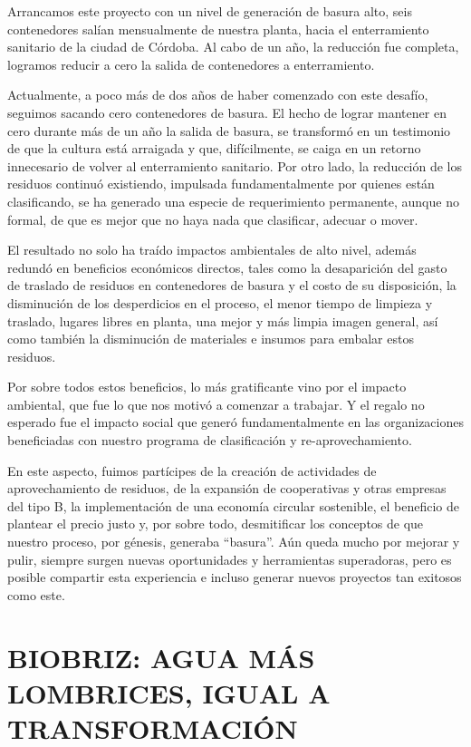 \documentclass[
]{article}
\begin{document}
Arrancamos este proyecto con un nivel de generación de basura alto, seis
contenedores salían mensualmente de nuestra planta, hacia el
enterramiento sanitario de la ciudad de Córdoba. Al cabo de un año, la
reducción fue completa, logramos reducir a cero la salida de
contenedores a enterramiento.

Actualmente, a poco más de dos años de haber comenzado con este desafío,
seguimos sacando cero contenedores de basura. El hecho de lograr
mantener en cero durante más de un año la salida de basura, se
transformó en un testimonio de que la cultura está arraigada y que,
difícilmente, se caiga en un retorno innecesario de volver al
enterramiento sanitario. Por otro lado, la reducción de los residuos
continuó existiendo, impulsada fundamentalmente por quienes están
clasificando, se ha generado una especie de requerimiento permanente,
aunque no formal, de que es mejor que no haya nada que clasificar,
adecuar o mover.

El resultado no solo ha traído impactos ambientales de alto nivel,
además redundó en beneficios económicos directos, tales como la
desaparición del gasto de traslado de residuos en contenedores de basura
y el costo de su disposición, la disminución de los desperdicios en el
proceso, el menor tiempo de limpieza y traslado, lugares libres en
planta, una mejor y más limpia imagen general, así como también la
disminución de materiales e insumos para embalar estos residuos.

Por sobre todos estos beneficios, lo más gratificante vino por el
impacto ambiental, que fue lo que nos motivó a comenzar a trabajar. Y el
regalo no esperado fue el impacto social que generó fundamentalmente en
las organizaciones beneficiadas con nuestro programa de clasificación y
re-aprovechamiento.

En este aspecto, fuimos partícipes de la creación de actividades de
aprovechamiento de residuos, de la expansión de cooperativas y otras
empresas del tipo B, la implementación de una economía circular
sostenible, el beneficio de plantear el precio justo y, por sobre todo,
desmitificar los conceptos de que nuestro proceso, por génesis, generaba
``basura''. Aún queda mucho por mejorar y pulir, siempre surgen nuevas
oportunidades y herramientas superadoras, pero es posible compartir esta
experiencia e incluso generar nuevos proyectos tan exitosos como este.

\cleardoublepage

\hypertarget{biobriz-agua-muxe1s-lombrices-igual-a-transformaciuxf3n}{%
\section{BIOBRIZ: AGUA MÁS LOMBRICES, IGUAL A
TRANSFORMACIÓN}\label{biobriz-agua-muxe1s-lombrices-igual-a-transformaciuxf3n}}
\end{document}
